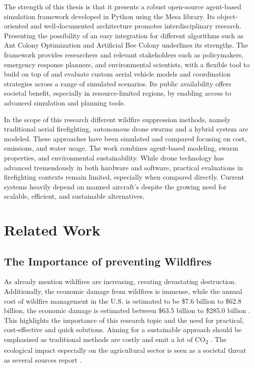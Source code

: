 \documentclass[twoside]{article}
\begin{document}
The strength of this thesis is that it presents a robust open-source agent-based simulation framework developed in Python using the Mesa library. Its object-oriented and well-documented architecture promotes interdisciplinary research. Presenting the possibility of an easy integration for different algorithms such as Ant Colony Optimization and Artificial Bee Colony underlines its strengths. The framework provides researchers and relevant stakeholders such as policymakers, emergency response planners, and environmental scientists, with a flexible tool to build on top of and evaluate custom aerial vehicle models and coordination strategies across a range of simulated scenarios. Its public availability offers societal benefit, especially in resource-limited regions, by enabling access to advanced simulation and planning tools.


In the scope of this research different wildfire suppression methods, namely traditional aerial firefighting, autonomous drone swarms and a hybrid system are modeled. These approaches have been simulated and compared focusing on cost, emissions, and water usage. The work combines agent-based modeling, swarm properties, and environmental sustainability. While drone technology has advanced tremendously in both hardware and software, practical evaluations in firefighting contexts remain limited, especially when compared directly. Current systems heavily depend on manned aircraft's despite the growing need for scalable, efficient, and sustainable alternatives.


\section{Related Work}

\subsection{The Importance of preventing Wildfires}
As already mention wildfires are increasing, creating devastating destruction. Additionally, the economic damage from wildfires is immense, while the annual cost of wildfire management in the U.S. is estimated to be  \$7.6 billion to \$62.8 billion, the economic damage is estimated between  \$63.5 billion to \$285.0 billion \cite{Afghah2019}. This highlights the importance of this research topic and the need for practical, cost-effective and quick solutions. Aiming for a sustainable approach should be emphasized as traditional methods are costly and emit a lot of CO\textsubscript{2} \cite{Saffre2022}. The ecological impact especially on the agricultural sector is seen as a societal threat as several sources report \citep{grassland_Wildfires,IPCC2023}. 
\end{document}
